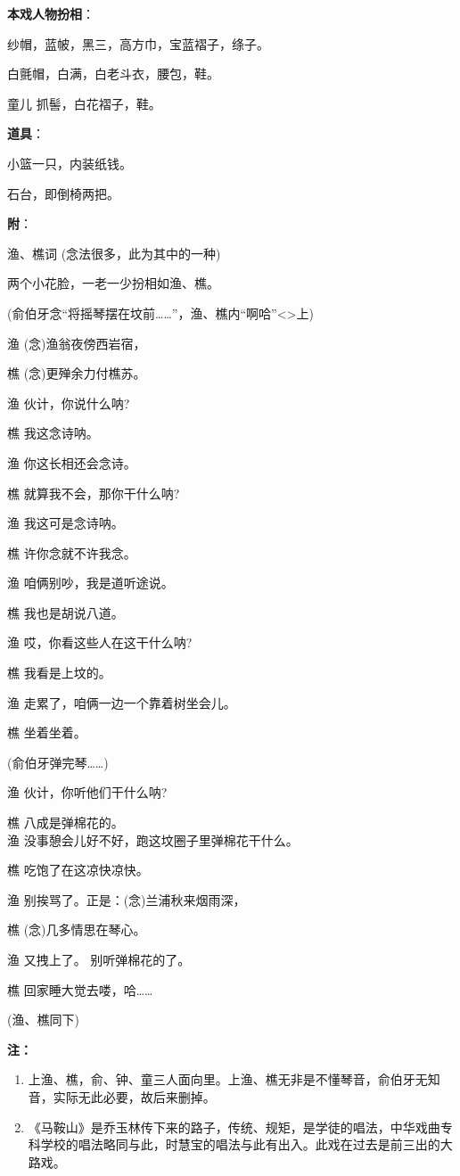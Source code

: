 {\bfseries\akai 本戏人物扮相}：

 纱帽，蓝帔，黑三，高方巾，宝蓝褶子，绦子。

 白氈帽，白满，白老斗衣，腰包，鞋。

童儿 抓髻，白花褶子，鞋。

{\bfseries\akai 道具}：

小篮一只，内装纸钱。

石台，即倒椅两把。

{\bfseries\akai 附}：

渔、樵词 (念法很多，此为其中的一种)

两个小花脸，一老一少扮相如渔、樵。

(俞伯牙念``将摇琴摆在坟前\ldots{}\ldots{}''，渔、樵内``啊哈''\textless{}\!\textgreater{}上)

渔 ({\akai 念})渔翁夜傍西岩宿，

樵 ({\akai 念})更殚余力付樵苏。

渔 伙计，你说什么呐?

樵 我这念诗呐。

渔 你这长相还会念诗。

樵 就算我不会，那你干什么呐?

渔 我这可是念诗呐。

樵 许你念就不许我念。

渔 咱俩别吵，我是道听途说。

樵 我也是胡说八道。

渔 哎，你看这些人在这干什么呐?

樵 我看是上坟的。

渔 走累了，咱俩一边一个靠着树坐会儿。

樵 坐着坐着。

(俞伯牙弹完琴\ldots{}\ldots{})

渔 伙计，你听他们干什么呐?

樵 八成是弹棉花的。\\
渔 没事憩会儿好不好，跑这坟圈子里弹棉花干什么。

樵 吃饱了在这凉快凉快。

渔 别挨骂了。正是：({\akai 念})兰浦秋来烟雨深，

樵 ({\akai 念})几多情思在琴心。

渔 又拽上了。 别听弹棉花的了。

樵 回家睡大觉去喽，哈\ldots{}\ldots{}

(渔、樵同下)

{\bfseries\akai 注：}

\begin{enumerate}
\def\labelenumi{\arabic{enumi}.}
\item
  上渔、樵，俞、钟、童三人面向里。上渔、樵无非是不懂琴音，俞伯牙无知音，实际无此必要，故后来删掉。
\item
  《马鞍山》是乔玉林传下来的路子，传统、规矩，是学徒的唱法，中华戏曲专科学校的唱法略同与此，时慧宝的唱法与此有出入。此戏在过去是前三出的大路戏。
\end{enumerate}

